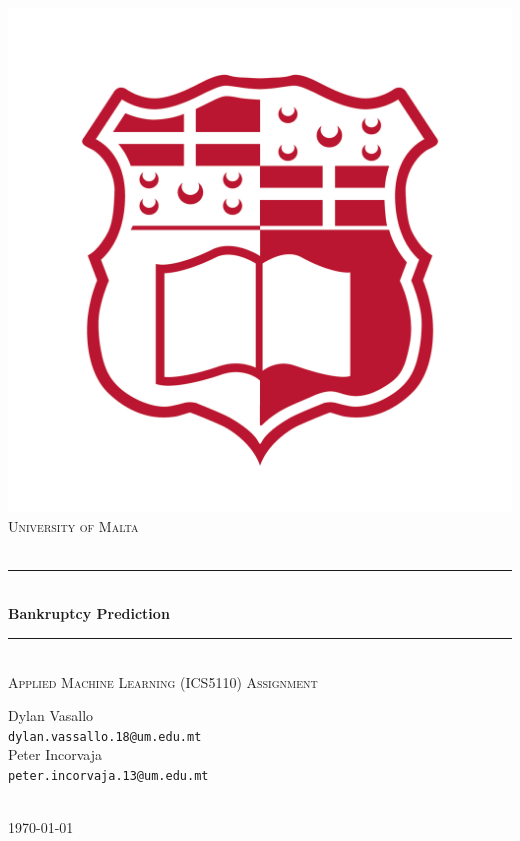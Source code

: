 \begin{titlepage}
\newcommand{\HRule}{\rule{\linewidth}{0.5mm}}
\center
\includegraphics[scale=0.15]{imgs/logo.png}\\[0.5cm] 
\textsc{\LARGE University of Malta}\\[0.3cm]
\textsc{}\\[2.5cm] 
\HRule \\[0.4cm]
{ \huge \bfseries Bankruptcy Prediction }\\[0.4cm] %
\HRule \\[.5cm]
\textsc{\large Applied Machine Learning (ICS5110) Assignment}\\[2.5cm] 

\begin{minipage}{0.4\textwidth}
\centering
\large{Dylan Vasallo} \\[0.2cm] \small \texttt{dylan.vassallo.18@um.edu.mt}
\\[0.5cm]
\large{Peter Incorvaja}  \\[0.2cm] \small \texttt{peter.incorvaja.13@um.edu.mt}
\end{minipage}\\[1cm]

{\medium \monthyeardate\today}
\end{titlepage}
